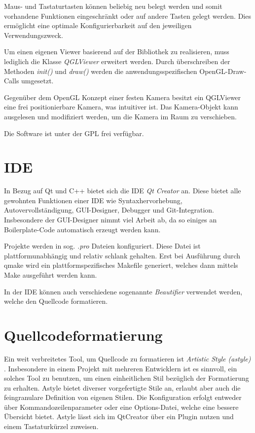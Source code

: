Maus- und Tastaturtasten können beliebig neu belegt werden und somit vorhandene Funktionen eingeschränkt oder auf andere Tasten gelegt werden.
Dies ermöglicht eine optimale Konfigurierbarkeit auf den jeweiligen Verwendungszweck.

Um einen eigenen Viewer basierend auf der Bibliothek zu realisieren, muss lediglich die Klasse \emph{QGLViewer} erweitert werden.
Durch überschreiben der Methoden \emph{init()} und \emph{draw()} werden die anwendungsspezifischen OpenGL-Draw-Calls umgesetzt.

Gegenüber dem OpenGL Konzept einer festen Kamera \cite{OpenGLCamera} besitzt ein QGLViewer eine frei positionierbare Kamera, was intuitiver ist.
Das Kamera-Objekt kann ausgelesen und modifiziert werden, um die Kamera im Raum zu verschieben.

Die Software ist unter der GPL frei verfügbar.

\section{IDE} 

In Bezug auf Qt und C++ bietet sich die IDE \emph{Qt Creator} \cite{QtCreator} an. 
Diese bietet alle gewohnten Funktionen einer IDE wie Syntaxhervorhebung, Autovervollständigung, GUI-Designer, Debugger und Git-Integration.
Insbesondere der GUI-Designer nimmt viel Arbeit ab, da so einiges an Boilerplate-Code automatisch erzeugt werden kann.

Projekte werden in sog. \emph{.pro} Dateien konfiguriert. 
Diese Datei ist plattformunabhängig und relativ schlank gehalten. 
Erst bei Ausführung durch qmake wird ein plattformspezifisches Makefile generiert, welches dann mittels Make ausgeführt werden kann.

In der IDE können auch verschiedene sogenannte \emph{Beautifier} verwendet werden, welche den Quellcode formatieren.

\section{Quellcodeformatierung}

Ein weit verbreitetes Tool, um Quellcode zu formatieren ist \emph{Artistic Style (astyle)} \cite{astyle}.
Insbesondere in einem Projekt mit mehreren Entwicklern ist es sinnvoll, ein solches Tool zu benutzen, um einen einheitlichen Stil bezüglich der Formatierung zu erhalten.
Astyle bietet diverser vorgefertigte Stile an, erlaubt aber auch die feingranulare Definition von eigenen Stilen.
Die Konfiguration erfolgt entweder über Kommandozeilenparameter oder eine Options-Datei, welche eine bessere Übersicht bietet.
Astyle lässt sich im QtCreator über ein Plugin nutzen und einem Tastaturkürzel zuweisen.

